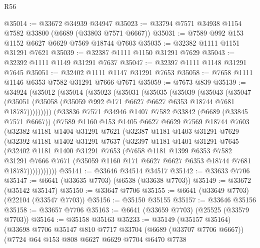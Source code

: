 \begin{lexlean}{R56}
\begin{coremodule}
@35014 := @33672 @34939 @34947
@35023 := @33794 @7571 @34938 @1154 @7582 @33800 (@6689 (@33803 @7571 @6667))
@35031 := @7589 @992 @153 @1152 @6627 @6629 @7569 @18744 @7603
@35035 := @32382 @1111 @1151 @31291 @7621
@35039 := @32387 @1111 @1150 @31291 @7629
@35043 := @32392 @1111 @1149 @31291 @7637
@35047 := @32397 @1111 @1148 @31291 @7645
@35051 := @32402 @1111 @1147 @31291 @7653
@35058 := @7658 @1111 @1146 @6353 @7582 @31291 @7666 @7671
@35059 := @7673 @839
@35139 := @34924
    (@35012
      (@35014
        (@35023
          (@35031
            (@35035
              (@35039
                (@35043
                  (@35047
                    (@35051 (@35058 (@35059 @992 @171 @6627 @6627 @6353 @18744 @7681 @18787)))))))))
        (@33836
          @7571
          @34946
          @1407
          @7582
          @33842
          (@6689 (@33845 @7571 @6667))
          (@7589
            @1160
            @153
            @1405
            @6627
            @6629
            @7569
            @18744
            @7603
            (@32382
              @1181
              @1404
              @31291
              @7621
              (@32387
                @1181
                @1403
                @31291
                @7629
                (@32392
                  @1181
                  @1402
                  @31291
                  @7637
                  (@32397
                    @1181
                    @1401
                    @31291
                    @7645
                    (@32402
                      @1181
                      @1400
                      @31291
                      @7653
                      (@7658
                        @1181
                        @1399
                        @6353
                        @7582
                        @31291
                        @7666
                        @7671
                        (@35059 @1160 @171 @6627 @6627 @6353 @18744 @7681 @18787)))))))))))
@35141 := @33646 @34514 @34517
@35142 := @33633 @7706
@35147 := @6641 (@33635 @7703) (@6538 (@33638 @7703))
@35149 := @33672 (@35142 @35147)
@35150 := @33647 @7706
@35155 := @6641 (@33649 @7703) (@22104 (@33547 @7703))
@35156 := @35150 @35155
@35157 := @33646 @35156
@35158 := @33657 @7706
@35163 := @6641 (@33659 @7703) (@25525 (@33579 @7703))
@35164 := @35158 @35163
@35233 := @35149
    (@35157 @35164)
    (@33698
      @7706
      @35147
      @810
      @7717
      @33704
      (@6689 (@33707 @7706 @6667))
      (@7724
        @64
        @153
        @808
        @6627
        @6629
        @7704
        @6470
        @7738

\end{coremodule}
\end{lexlean}
